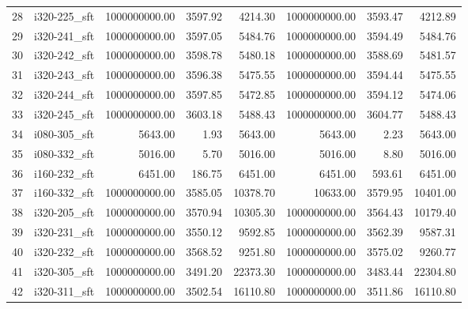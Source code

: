 \begin{tabular}{llrrrrrr}
28 &  i320-225\_sft &    1000000000.00 &              3597.92 &        4214.30 &    1000000000.00 &              3593.47 &        4212.89 \\
29 &  i320-241\_sft &    1000000000.00 &              3597.05 &        5484.76 &    1000000000.00 &              3594.49 &        5484.76 \\
30 &  i320-242\_sft &    1000000000.00 &              3598.78 &        5480.18 &    1000000000.00 &              3588.69 &        5481.57 \\
31 &  i320-243\_sft &    1000000000.00 &              3596.38 &        5475.55 &    1000000000.00 &              3594.44 &        5475.55 \\
32 &  i320-244\_sft &    1000000000.00 &              3597.85 &        5472.85 &    1000000000.00 &              3594.12 &        5474.06 \\
33 &  i320-245\_sft &    1000000000.00 &              3603.18 &        5488.43 &    1000000000.00 &              3604.77 &        5488.43 \\
34 &  i080-305\_sft &          5643.00 &                 1.93 &        5643.00 &          5643.00 &                 2.23 &        5643.00 \\
35 &  i080-332\_sft &          5016.00 &                 5.70 &        5016.00 &          5016.00 &                 8.80 &        5016.00 \\
36 &  i160-232\_sft &          6451.00 &               186.75 &        6451.00 &          6451.00 &               593.61 &        6451.00 \\
37 &  i160-332\_sft &    1000000000.00 &              3585.05 &       10378.70 &         10633.00 &              3579.95 &       10401.00 \\
38 &  i320-205\_sft &    1000000000.00 &              3570.94 &       10305.30 &    1000000000.00 &              3564.43 &       10179.40 \\
39 &  i320-231\_sft &    1000000000.00 &              3550.12 &        9592.85 &    1000000000.00 &              3562.39 &        9587.31 \\
40 &  i320-232\_sft &    1000000000.00 &              3568.52 &        9251.80 &    1000000000.00 &              3575.02 &        9260.77 \\
41 &  i320-305\_sft &    1000000000.00 &              3491.20 &       22373.30 &    1000000000.00 &              3483.44 &       22304.80 \\
42 &  i320-311\_sft &    1000000000.00 &              3502.54 &       16110.80 &    1000000000.00 &              3511.86 &       16110.80 \\

\end{tabular}
